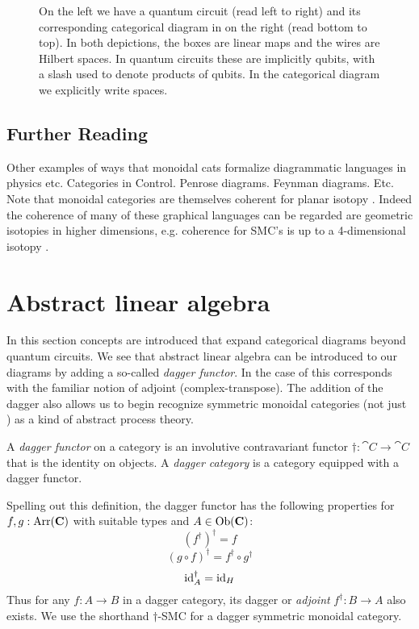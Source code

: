 \begin{figure}[t]
\label{fig:QCDSMC}

\caption[Comparison of quantum circuits and symmetric monoidal diagrams]{On the left we have a quantum circuit (read left to right) and its corresponding categorical diagram in  on the right (read bottom to top). In both depictions, the boxes are linear maps and the wires are Hilbert spaces. In quantum circuits these are implicitly qubits, with a slash used to denote products of qubits. In the categorical diagram we explicitly write spaces.}
\end{figure}

\subsection{Further Reading}
Other examples of ways that monoidal cats formalize diagrammatic languages in physics etc.  Categories in Control. Penrose diagrams. Feynman diagrams. Etc.  Note that monoidal categories are themselves coherent for planar isotopy \cite{joyal1991geometry}. Indeed the coherence of many of these graphical languages can be regarded are geometric isotopies in higher dimensions, e.g. coherence for SMC's is up to a 4-dimensional isotopy \cite{selinger2011survey}.

\section{Abstract linear algebra}
\label{sec:AbstractLinAlg}
In this section concepts are introduced that expand categorical diagrams beyond quantum circuits. We see that abstract linear algebra can be introduced to our diagrams by adding a so-called \emph{dagger functor}.  In the case of  this corresponds with the familiar notion of adjoint (complex-transpose).  The addition of the dagger also allows us to begin recognize symmetric monoidal categories (not just ) as a kind of abstract process theory. 

\begin{defn}
\label{defn:dagger}
A \emph{dagger functor} on a category  is an involutive contravariant functor $\dagger:\cat{C}\to\cat{C}$ that is the identity on objects. A \emph{dagger category} is a category equipped with a dagger functor.
\end{defn}
Spelling out this definition, the dagger functor has the following properties for $f,g:\mbox{Arr}(\mathbf{C})$ with suitable types and $A\in\mbox{Ob}(\mathbf{C})$:
\begin{equation}
\left(f^{\dagger}\right)^{\dagger} = f 
\end{equation}
\begin{equation}
(g\circ f)^{\dagger} = f^{\dagger}\circ g^{\dagger}
\end{equation}
\begin{equation}
\mbox{id}_{A}^{\dagger} = \mbox{id}_{H}
\end{equation}
Thus for any $f:A\to B$ in a dagger category, its dagger or \emph{adjoint} $f^{\dagger}:B\to A$ also exists. We use the shorthand $\dagger$-SMC for a dagger symmetric monoidal category.

